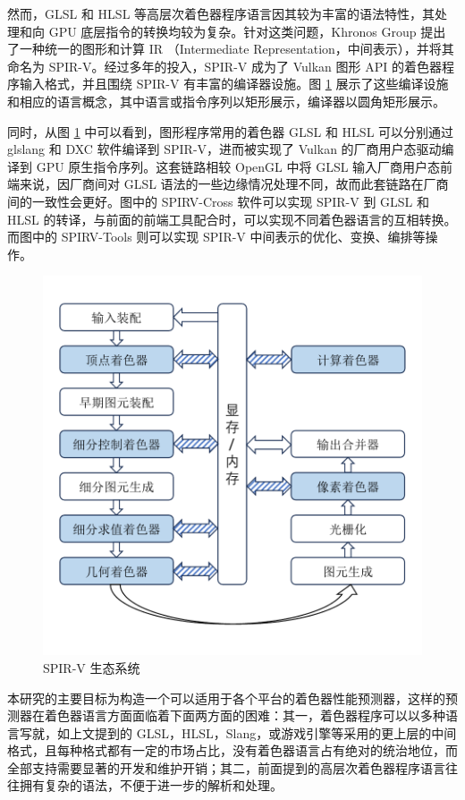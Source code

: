 然而，GLSL 和 HLSL 等高层次着色器程序语言因其较为丰富的语法特性，其处理和向 GPU 底层指令的转换均较为复杂。针对这类问题，Khronos Group 提出了一种统一的图形和计算 IR （Intermediate Representation，中间表示），并将其命名为 SPIR-V。经过多年的投入，SPIR-V 成为了 Vulkan 图形 API 的着色器程序输入格式，并且围绕 SPIR-V 有丰富的编译器设施。图 \ref{fig:spirv_ecosystem} 展示了这些编译设施和相应的语言概念，其中语言或指令序列以矩形展示，编译器以圆角矩形展示。

同时，从图 \ref{fig:spirv_ecosystem} 中可以看到，图形程序常用的着色器 GLSL 和 HLSL 可以分别通过 glslang 和 DXC 软件编译到 SPIR-V，进而被实现了 Vulkan 的厂商用户态驱动编译到 GPU 原生指令序列。这套链路相较 OpenGL 中将 GLSL 输入厂商用户态前端来说，因厂商间对 GLSL 语法的一些边缘情况处理不同，故而此套链路在厂商间的一致性会更好。图中的 SPIRV-Cross 软件可以实现 SPIR-V 到 GLSL 和 HLSL 的转译，与前面的前端工具配合时，可以实现不同着色器语言的互相转换。而图中的 SPIRV-Tools 则可以实现 SPIR-V 中间表示的优化、变换、编排等操作。

\begin{figure}
    \centering
    \includegraphics[page=3, width=0.6\linewidth, trim=50 50 50 50, clip]{figures/pictures.pdf}
    \caption{SPIR-V 生态系统}
    \label{fig:spirv_ecosystem}
\end{figure}

本研究的主要目标为构造一个可以适用于各个平台的着色器性能预测器，这样的预测器在着色器语言方面面临着下面两方面的困难：其一，着色器程序可以以多种语言写就，如上文提到的 GLSL，HLSL，Slang，或游戏引擎等采用的更上层的中间格式，且每种格式都有一定的市场占比，没有着色器语言占有绝对的统治地位，而全部支持需要显著的开发和维护开销；其二，前面提到的高层次着色器程序语言往往拥有复杂的语法，不便于进一步的解析和处理。

